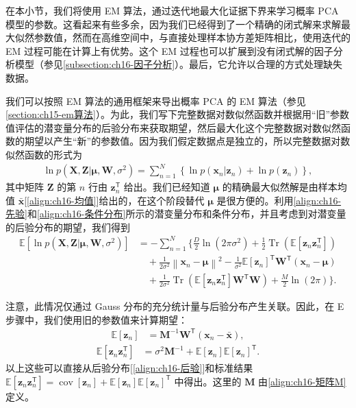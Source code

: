 \documentclass[../../main.tex]{subfiles}
\begin{document}
在本小节，我们将使用 EM 算法，通过迭代地最大化证据下界来学习概率 PCA 模型的参数。这看起来有些多余，因为我们已经得到了一个精确的闭式解来求解最大似然参数值，然而在高维空间中，与直接处理样本协方差矩阵相比，使用迭代的 EM 过程可能在计算上有优势。这个 EM 过程也可以扩展到没有闭式解的因子分析模型（参见\cref{subsection:ch16-因子分析}）。最后，它允许以合理的方式处理缺失数据。

我们可以按照 EM 算法的通用框架来导出概率 PCA 的 EM 算法（参见\cref{section:ch15-em算法}）。为此，我们写下完整数据对数似然函数并根据用“旧”参数值评估的潜变量分布的后验分布来获取期望，然后最大化这个完整数据对数似然函数的期望以产生“新”的参数值。因为我们假定数据点是独立的，所以完整数据对数似然函数的形式为
\begin{align}
  \ln p(\bm{X},\bm{Z}|\bm{\mu},\bm{W},\sigma^2)=\sum_{n=1}^{N}\left\{\ln p(\bm{x}_n|\bm{z}_n)+\ln p(\bm{z}_n)\right\},
  \label{align:ch16-完全数据似然}
\end{align}
其中矩阵 $\bm{Z}$ 的第 $n$ 行由 $\bm{z}_n^{\mathsf T}$ 给出。我们已经知道 $\bm{\mu}$ 的精确最大似然解是由样本均值 $\bar{\bm{x}}$[\eqref{align:ch16-均值}]给出的，在这个阶段替代 $\bm{\mu}$ 是很方便的。利用\eqref{align:ch16-先验}和\eqref{align:ch16-条件分布}所示的潜变量分布和条件分布，并且考虑到对潜变量的后验分布的期望，我们得到
\begin{align}
  \mathbb{E}\left[\ln p(\bm{X},\bm{Z}|\bm{\mu},\bm{W},\sigma^2)\right]&=-\sum_{n=1}^{N}\Bigg\{\frac{D}{2}\ln(2\pi\sigma^2)+\frac{1}{2}\operatorname{Tr}\left(\mathbb{E}[\bm{z}_n\bm{z}_n^{\mathsf T}]\right)\nonumber\\
  &\quad+\frac{1}{2\sigma^2}\left\|\bm{x}_n-\bm{\mu}\right\|^2-\frac{1}{\sigma^2}\mathbb{E}[\bm{z}_n]^{\mathsf T}\bm{W}^{\mathsf T}(\bm{x}_n-\bm{\mu})\nonumber\\
  &\quad+\frac{1}{2\sigma^2}\operatorname{Tr}\left(\mathbb{E}[\bm{z}_n\bm{z}_n^{\mathsf T}]\bm{W}^{\mathsf T}\bm{W}\right)+\frac{M}{2}\ln(2\pi)\Bigg\}.
  \label{align:ch16-完全数据期望}
\end{align}

注意，此情况仅通过 Gauss 分布的充分统计量与后验分布产生关联。因此，在 E 步骤中，我们使用旧的参数值来计算期望：
\begin{align}
  \mathbb{E}[\bm{z}_n]&=\bm{M}^{-1}\bm{W}^{\mathsf T}(\bm{x}_n-\bar{\bm{x}}),
  \label{align:ch16-E步z}
\end{align}
\begin{align}
  \mathbb{E}[\bm{z}_n\bm{z}_n^{\mathsf T}]&=\sigma^2\bm{M}^{-1}+\mathbb{E}[\bm{z}_n]\mathbb{E}[\bm{z}_n]^{\mathsf T}.
  \label{align:ch16-E步zz}
\end{align}
以上这些可以直接从后验分布[\eqref{align:ch16-后验}]和标准结果 $\mathbb{E}[\bm{z}_n\bm{z}_n^{\mathsf T}]=\operatorname{cov}[\bm{z}_n]+\mathbb{E}[\bm{z}_n]\mathbb{E}[\bm{z}_n]^{\mathsf T}$ 中得出。这里的 $\bm{M}$ 由\eqref{align:ch16-矩阵M}定义。
\end{document}
